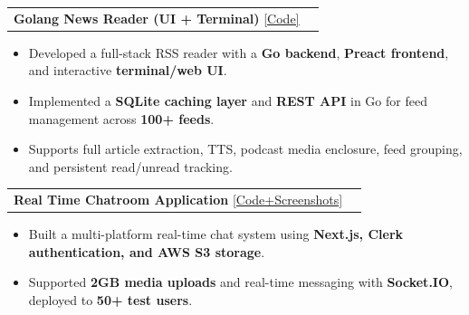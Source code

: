 \documentclass[letterpaper,11pt]{article}
\makeatletter
\newcommand{\resumeItem}[1]{%
  \item\small{#1}%
}
\newcommand{\resumeProjectHeading}[2]{
    \item
    \begin{tabular*}{0.97\textwidth}{l@{\extracolsep{\fill}}r}
      \small#1 & #2 \\
    \end{tabular*}\vspace{-7pt}
}
\newcommand{\resumeItemListStart}{%
  \begin{itemize}[itemsep=0pt, parsep=0pt, topsep=0pt, partopsep=0pt]
}
\newcommand{\resumeItemListEnd}{\end{itemize}\vspace{-5pt}}
\makeatother
\begin{document}
      \resumeProjectHeading
          {\textbf{Golang News Reader (UI + Terminal)} \href{https://github.com/nikhilCad/rss-reader-go}{\underline{[Code]}}}{}
          \resumeItemListStart
            \resumeItem{Developed a full-stack RSS reader with a \textbf{Go backend}, \textbf{Preact frontend}, and interactive \textbf{terminal/web UI}.}
            \resumeItem{Implemented a \textbf{SQLite caching layer} and \textbf{REST API} in Go for feed management across \textbf{100+ feeds}.}
            \resumeItem{Supports full article extraction, TTS, podcast media enclosure, feed grouping, and persistent read/unread tracking.}
          \resumeItemListEnd


      \resumeProjectHeading
          {\textbf{Real Time Chatroom Application} \href{https://github.com/nikhilCad/real-time-chatroom}{\underline{[Code+Screenshots]}}}{}
          \resumeItemListStart
            \resumeItem{Built a multi-platform real-time chat system using \textbf{Next.js, Clerk authentication, and AWS S3 storage}.}
            \resumeItem{Supported \textbf{2GB media uploads} and real-time messaging with \textbf{Socket.IO}, deployed to \textbf{50+ test users}.}
          \resumeItemListEnd
\end{document}
